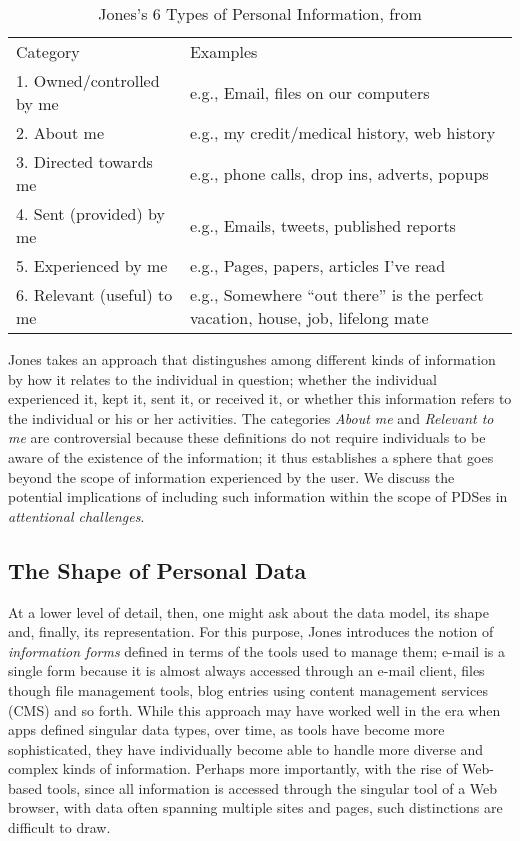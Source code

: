 \documentclass[runningheads,a4paper]{llncs}
\begin{document}
\begin{table}
\begin{tabular}{p{4cm} p{8cm}} 
Category & Examples \\
1. Owned/controlled by me & e.g., Email, files on our computers  \\
2. About me	& e.g., my credit/medical history, web history \\
3. Directed towards me & e.g., phone calls, drop ins, adverts, popups \\
4. Sent (provided) by me & e.g.,  Emails, tweets, published reports  \\
5. Experienced by me & e.g.,  Pages, papers, articles I’ve read \\
6. Relevant (useful) to me	& e.g.,  Somewhere ``out there'' is the perfect vacation, house, job, lifelong mate \\
\end{tabular}
\caption{Jones's 6 Types of Personal Information, from \cite{kftf}}
\label{fig:jonestype}
\end{table}

Jones takes an approach that distingushes among different kinds of information by how it relates to the individual in question; whether the individual experienced it, kept it, sent it, or received it, or whether this information refers to the individual or his or her activities.  The categories \emph{About me} and \emph{Relevant to me} are controversial because these definitions do not require individuals to be aware of the existence of the information; it thus establishes a sphere that goes beyond the scope of information experienced by the user.  We discuss the potential implications of including such information within the scope of PDSes in \emph{attentional challenges}. 

\subsection{The Shape of Personal Data}

At a lower level of detail, then, one might ask about the data model, its shape and, finally, its representation.  For this purpose, Jones introduces the notion of \emph{information forms} defined in terms of the tools used to manage them; e-mail is a single form because it is almost always accessed through an e-mail client, files though file management tools, blog entries using content management services (CMS) and so forth.  While this approach may have worked well in the era when apps defined singular data types, over time, as tools have become more sophisticated, they have individually become  able to handle more diverse and complex kinds of information.  Perhaps more importantly, with the rise of Web-based tools, since all information is accessed through the singular tool of a Web browser, with data often spanning multiple sites and pages, such distinctions are difficult to draw.
\end{document}

